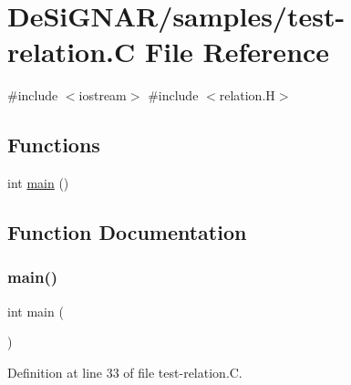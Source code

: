 \hypertarget{test-relation_8_c}{}\section{De\+Si\+G\+N\+A\+R/samples/test-\/relation.C File Reference}
\label{test-relation_8_c}
{\ttfamily \#include $<$iostream$>$}\newline
{\ttfamily \#include $<$relation.\+H$>$}\newline
\subsection*{Functions}
\begin{DoxyCompactItemize}
\item 
int \hyperlink{test-relation_8_c_ae66f6b31b5ad750f1fe042a706a4e3d4}{main} ()
\end{DoxyCompactItemize}


\subsection{Function Documentation}
\mbox{\label{test-relation_8_c_ae66f6b31b5ad750f1fe042a706a4e3d4}} 
\subsubsection{\texorpdfstring{main()}{main()}}
{\footnotesize\ttfamily int main (\begin{DoxyParamCaption}{ }\end{DoxyParamCaption})}



Definition at line 33 of file test-\/relation.\+C.

